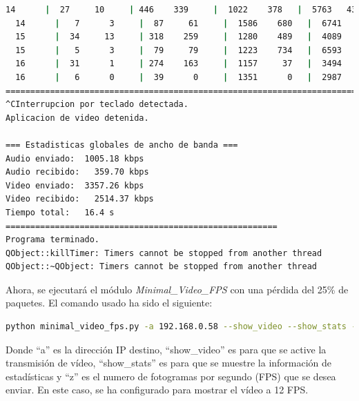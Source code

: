 \begin{lstlisting}[language=bash,basicstyle=\ttfamily\scriptsize]
  14      |  27     10     | 446    339     |  1022    378   |  5763   4379   |  32     70
  14      |   7      3     |  87     61     |  1586    680   |  6741   4711   |  34     69
  15      |  34     13     | 318    259     |  1280    489   |  4089   3332   |  27     74
  15      |   5      3     |  79     79     |  1223    734   |  6593   6609   |  52     77
  16      |  31      1     | 274    163     |  1157     37   |  3494   2078   |  31     74
  16      |   6      0     |  39      0     |  1351      0   |  2987      0   |  27     72
============================================================================================
^CInterrupcion por teclado detectada.
Aplicacion de video detenida.

=== Estadisticas globales de ancho de banda ===
Audio enviado:	1005.18 kbps
Audio recibido:   359.70 kbps
Video enviado:	3357.26 kbps
Video recibido:   2514.37 kbps
Tiempo total: 	16.4 s
=======================================================
Programa terminado.
QObject::killTimer: Timers cannot be stopped from another thread
QObject::~QObject: Timers cannot be stopped from another thread
\end{lstlisting}
\vspace{\baselineskip}

\newpage

Ahora, se ejecutará el módulo \textit{Minimal\_Video\_FPS} con una pérdida del 25\% de paquetes. El comando usado ha sido el siguiente:

\begin{lstlisting}[language=bash, basicstyle=\ttfamily\scriptsize]
    python minimal_video_fps.py -a 192.168.0.58 --show_video --show_stats -z 12
\end{lstlisting}
Donde ``a'' es la dirección IP destino, ``show\_video'' es para que se active la transmisión de vídeo, ``show\_stats'' es para que se muestre la información de estadísticas y ``z'' es el numero de fotogramas por segundo (FPS) que se desea enviar. En este caso, se ha configurado para mostrar el vídeo a 12 FPS.
\vspace{\baselineskip}

